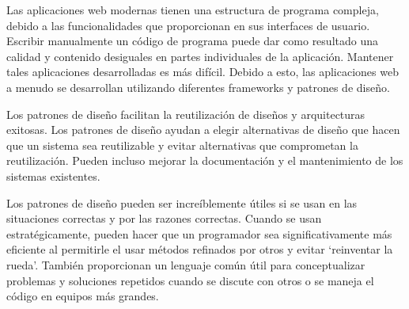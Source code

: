 Las aplicaciones web modernas tienen una estructura de programa compleja, debido a las funcionalidades que proporcionan en sus interfaces de usuario. Escribir manualmente un código de programa puede dar como resultado una calidad y contenido desiguales en partes individuales de la aplicación. Mantener tales aplicaciones desarrolladas es más difícil. Debido a esto, las aplicaciones web a menudo se desarrollan utilizando diferentes frameworks y patrones de diseño.
\vspace{0.8cm}

Los patrones de diseño facilitan la reutilización de diseños y arquitecturas exitosas. Los patrones de diseño ayudan a elegir alternativas de diseño que hacen que un sistema sea reutilizable y evitar alternativas que comprometan la reutilización. Pueden incluso mejorar la documentación y el mantenimiento de los sistemas existentes.
\vspace{0.8cm}

Los patrones de diseño pueden ser increíblemente útiles si se usan en las situaciones correctas y por las razones correctas. Cuando se usan estratégicamente, pueden hacer que un programador sea significativamente más eficiente al permitirle el usar métodos refinados por otros y evitar `reinventar la rueda'. También proporcionan un lenguaje común útil para conceptualizar problemas y soluciones repetidos cuando se discute con otros o se maneja el código en equipos más grandes.